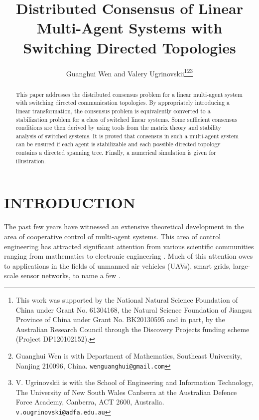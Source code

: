 \documentclass[letterpaper, 10 pt, conference]{ieeeconf}
\title{\LARGE \bf
Distributed Consensus of Linear Multi-Agent Systems with Switching Directed Topologies
}
\author{Guanghui Wen and Valery Ugrinovskii\thanks{This work was supported by the National Natural Science Foundation
  of China under Grant No. 61304168, the Natural Science
Foundation of Jiangsu Province of China under Grant No. BK20130595 and in
part, by the Australian Research Council through the Discovery Projects
funding scheme (Project DP120102152).}\thanks{Guanghui Wen is with Department of Mathematics, Southeast University,
Nanjing 210096, China.
        {\tt\small wenguanghui@gmail.com}}\thanks{V. Ugrinovskii is with the School of Engineering
and Information Technology, The University of New South Wales Canberra at
the Australian Defence Force Academy, Canberra, ACT 2600, Australia.
{\tt\small v.ougrinovski@adfa.edu.au}}}
\begin{document}
\maketitle
\thispagestyle{empty}
\pagestyle{empty}


\begin{abstract}
This paper addresses the distributed consensus
problem for a linear multi-agent system with switching directed communication
topologies. By appropriately introducing a linear transformation,
the consensus problem is equivalently converted to a stabilization problem for a class of switched linear systems. Some sufficient consensus conditions are then
derived by using tools from the matrix theory and stability analysis of
switched systems. It is proved that consensus
 in such a multi-agent system can be ensured if each agent is stabilizable
 and each possible directed topology contains a directed spanning
 tree. Finally, a numerical simulation is given for illustration.
\end{abstract}


\section{INTRODUCTION}
The past few years have witnessed an extensive theoretical development in
the area of cooperative control of multi-agent systems. This area of
control engineering has attracted significant
attention from various scientific communities ranging from mathematics to electronic engineering \cite{SaberFaxMurray2007Survey,RenBeardAtkins2007Survey}.
Much of this attention owes to applications
in the fields of unmanned air vehicles (UAVs), smart grids, large-scale
sensor networks, to name a few
\cite{RenBeardAtkins2007Survey,Ugrinovskii2011Automatica,MeiZhangCaoBook2011}.

\par
\end{document}
